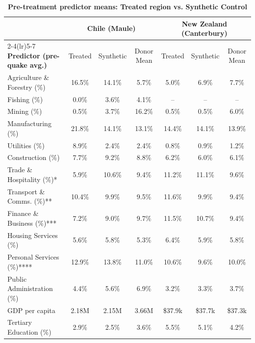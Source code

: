 \documentclass[12pt]{article}
\begin{document}
\begin{table}[H]
\centering
\caption{\textbf{Pre-treatment predictor means: Treated region vs. Synthetic Control}}
\label{tab:predictors}
\small %
\setlength{\tabcolsep}{4pt} %
\begin{threeparttable}
\begin{tabular}{lcccccc}
\toprule
& \multicolumn{3}{c}{\textbf{Chile (Maule)}} & \multicolumn{3}{c}{\textbf{New Zealand (Canterbury)}} \\
\cmidrule(lr){2-4}\cmidrule(lr){5-7}
\textbf{Predictor (pre-quake avg.)} & Treated & Synthetic & Donor Mean & Treated & Synthetic & Donor Mean \\
\midrule
Agriculture \& Forestry (\%)     & 16.5\% & 14.1\% & 5.7\%  & 5.0\%  & 6.9\%  & 7.7\%  \\
Fishing (\%)                     & 0.0\%  & 3.6\%  & 4.1\%  & --     & --     & --     \\
Mining (\%)                      & 0.5\%  & 3.7\%  & 16.2\% & 0.5\%  & 0.5\%  & 6.0\%  \\
Manufacturing (\%)               & 21.8\% & 14.1\% & 13.1\% & 14.4\% & 14.1\% & 13.9\% \\
Utilities (\%)                   & 8.9\%  & 2.4\%  & 2.4\%  & 0.8\%  & 0.9\%  & 1.2\%  \\
Construction (\%)                & 7.7\%  & 9.2\%  & 8.8\%  & 6.2\%  & 6.0\%  & 6.1\%  \\
Trade \& Hospitality (\%)*       & 5.9\%  & 10.6\% & 9.4\%  & 11.2\% & 11.1\% & 9.6\%  \\
Transport \& Comms. (\%)**       & 10.4\% & 9.9\%  & 9.5\%  & 11.6\% & 9.9\%  & 9.4\%  \\
Finance \& Business (\%)***      & 7.2\%  & 9.0\%  & 9.7\%  & 11.5\% & 10.7\% & 9.4\%  \\
Housing Services (\%)            & 5.6\%  & 5.8\%  & 5.3\%  & 6.4\%  & 5.9\%  & 5.8\%  \\
Personal Services (\%)****       & 12.9\% & 13.8\% & 11.0\% & 10.6\% & 9.6\%  & 10.0\% \\
Public Administration (\%)       & 4.4\%  & 5.6\%  & 6.9\%  & 3.2\%  & 3.3\%  & 3.7\%  \\
GDP per capita                   & 2.18M  & 2.15M  & 3.66M  & \$37.9k & \$37.7k & \$37.3k \\
Tertiary Education (\%)          & 2.9\%  & 2.5\%  & 3.6\%  & 5.5\%  & 5.1\%  & 4.2\%  \\

\end{tabular}
\end{threeparttable}
\end{table}
\end{document}
